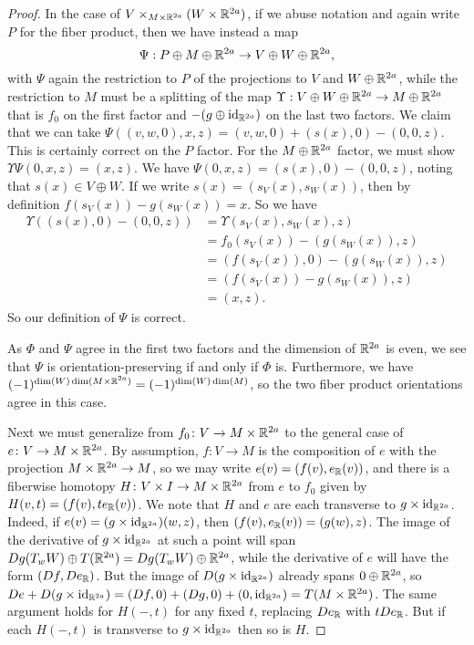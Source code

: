 \begin{proof}
	In the case of $V\times_{M \times \mathbb{R}^{2a}} (W \times \mathbb{R}^{2a})$, if we abuse notation and again write $P$ for the fiber product, then we have instead a map
	\begin{equation}\label{E: fiber plus euclidean}
		\Psi: P \oplus M \oplus \mathbb{R}^{2a} \to V \oplus W \oplus \mathbb{R}^{2a},
	\end{equation}
	with $\Psi$ again the restriction to $P$ of the projections to $V$ and $W \oplus \mathbb{R}^{2a}$, while the restriction to $M$ must be a splitting of the map $\Upsilon: V \oplus W \oplus \mathbb{R}^{2a} \to M \oplus \mathbb{R}^{2a}$ that is $f_0$ on the first factor and $-(g \oplus \mathrm{id}_{\mathbb{R}^{2a}})$ on the last two factors.
	We claim that we can take $\Psi((v,w,0),x,z) = (v,w,0)+(s(x),0)-(0,0,z)$.
	This is certainly correct on the $P$ factor.
	For the $M \oplus \mathbb{R}^{2a}$ factor, we must show $\Upsilon \Psi(0,x,z) = (x,z)$.
	We have $\Psi(0,x,z) = (s(x),0)-(0,0,z)$, noting that $s(x) \in V \oplus W$.
	If we write $s(x) = (s_V(x),s_W(x))$, then by definition $f(s_V(x))-g(s_W(x)) = x$.
	So we have \begin{align*}
		\Upsilon((s(x),0)-(0,0,z))& = \Upsilon(s_V(x),s_W(x),z)\\& = f_0(s_V(x))-(g(s_W(x)),z)\\& = (f(s_V(x)),0)-(g(s_W(x)),z)\\& = (f(s_V(x))-g(s_W(x)),z)\\& = (x,z).\end{align*}
	So our definition of $\Psi$ is correct.

	As $\Phi$ and $\Psi$ agree in the first two factors and the dimension of $\mathbb{R}^{2a}$ is even, we see that $\Psi$ is orientation-preserving if and only if $\Phi$ is.
	Furthermore, we have $(-1)^{\dim(W)\dim(M \times \mathbb{R}^{2a})} = (-1)^{\dim(W)\dim(M)}$, so the two fiber product orientations agree in this case.

	Next we must generalize from $f_0 \colon V \to M \times \mathbb{R}^{2a}$ to the general case of $e \colon V \to M \times \mathbb{R}^{2a}$.
	By assumption, $f \colon V \to M$ is the composition of $e$ with the projection $M \times \mathbb{R}^{2a} \to M$, so we may write $e(v) = (f(v), e_{\mathbb{R}}(v))$, and there is a fiberwise homotopy $H \colon V \times I \to M \times \mathbb{R}^{2a}$ from $e$ to $f_0$ given by $H(v,t) = (f(v), te_{\mathbb{R}}(v))$.
	We note that $H$ and $e$ are each transverse to $g \times \mathrm{id}_{\mathbb{R}^{2a}}$.
	Indeed, if $e(v) = (g \times \mathrm{id}_{\mathbb{R}^{2a}})(w,z)$, then $(f(v),e_{\mathbb{R}}(v)) = (g(w),z)$.
	The image of the derivative of $g \times \mathrm{id}_{\mathbb{R}^{2a}}$ at such a point will span $Dg(T_wW) \oplus T(\mathbb{R}^{2a}) = Dg(T_wW) \oplus \mathbb{R}^{2a}$, while the derivative of $e$ will have the form $(Df,De_{\mathbb{R}})$.
	But the image of $D(g \times \mathrm{id}_{\mathbb{R}^{2a}})$ already spans $0\oplus \mathbb{R}^{2a}$, so $De+D(g \times \mathrm{id}_{\mathbb{R}^{2a}}) = (Df,0)+(Dg,0)+(0,\mathrm{id}_{\mathbb{R}^{2a}}) = T(M \times \mathbb{R}^{2a})$.
	The same argument holds for $H(-,t)$ for any fixed $t$, replacing $De_{\mathbb{R}}$ with $tDe_{\mathbb{R}}$.
	But if each $H(-,t)$ is transverse to $g \times \mathrm{id}_{\mathbb{R}^{2a}}$ then so is $H$.


\end{proof}
